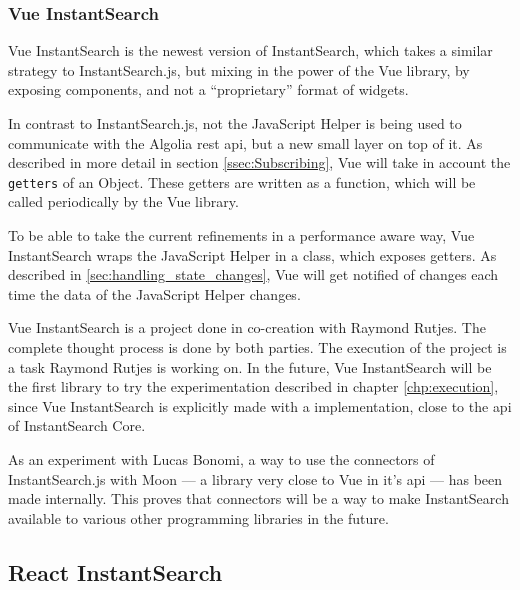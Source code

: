 
\subsubsection{Vue InstantSearch} %
\label{ssub:vue_instantsearch}

Vue InstantSearch is the newest version of InstantSearch, which takes a similar strategy to InstantSearch.js, but mixing in the power of the Vue \gls{library}, by exposing components, and not a ``proprietary'' format of widgets.

In contrast to InstantSearch.js, not the JavaScript Helper is being used to communicate with the Algolia \acrshort{rest} \acrshort{api}, but a new small layer on top of it. As described in more detail in section \ref{ssec:Subscribing}, Vue will take in account the {\tt getters} of an Object. These getters are written as a function, which will be called periodically by the Vue \gls{library}. 

To be able to take the current refinements in a performance aware way, Vue InstantSearch wraps the JavaScript Helper in a class, which exposes getters. As described in \ref{sec:handling_state_changes}, Vue will get notified of changes each time the data of the JavaScript Helper changes.

Vue InstantSearch is a project done in co-creation with Raymond Rutjes. The complete thought process is done by both parties. The execution of the project is a task Raymond Rutjes is working on. In the future, Vue InstantSearch will be the first \gls{library} to try the experimentation described in chapter \ref{chp:execution}, since Vue InstantSearch is explicitly made with a implementation, close to the \acrshort{api} of InstantSearch Core.

As an experiment with Lucas Bonomi, a way to use the connectors of InstantSearch.js with Moon --- a \gls{library} very close to Vue in it's \acrshort{api} --- has been made internally. This proves that connectors will be a way to make InstantSearch available to various other programming libraries in the future.




\subsection{React InstantSearch} %
\label{sub:react_instantearch}

